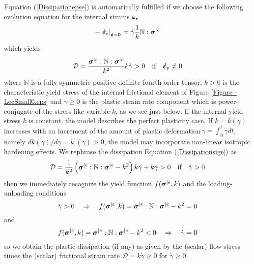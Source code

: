 \documentclass[preprint,review,12pt,sort&compress]{elsarticle}%
\newcommand{\epsdo}[0]{\scriptsize\mathbf{\dot \varepsilon} = \mathbf{0}\normalsize\mathbf{}}
\renewcommand{\mathbf}[1]{\mbox{\boldmath $#1$ \unboldmath}  \!\!}
\begin{document}
Equation (\ref{Dissipationepse}) is automatically fulfilled if we choose the
following evolution equation for the internal strains $\mathbf{\varepsilon
}_{e}$%
\begin{equation}
-\left.  \mathbf{\dot{\varepsilon}}_{e}\right\vert _{%
\epsdo
}=\dot{\gamma}\frac{1}{k}\mathbb{N}:\mathbf{\sigma}^{|e}
\label{flow rule small}%
\end{equation}
which yields%
\begin{equation}
\mathcal{D}=\frac{\mathbf{\sigma}^{|e}:\mathbb{N}:\mathbf{\sigma}^{|e}}{k^{2}%
}k\dot{\gamma}>0\text{\quad if}\quad\mathbf{\dot{\varepsilon}}_{p}\neq0
\label{Dissipationsige}%
\end{equation}
where $\mathbb{N}$ is a fully symmetric positive definite fourth-order tensor,
$k>0$ is the characteristic yield stress of the internal frictional element of
Figure \ref{Figure - LeeSmall0.eps} and $\dot{\gamma}\geq0$ is the plastic
strain rate component which is power-conjugate of the stress-like variable
$k$, as we see just below. If the internal yield stress $k$ is constant, the
model describes the perfect plasticity case. If $k=k\left(  \gamma\right)  $
increases with an increment of the amount of plastic deformation$\ \gamma
=\int_{0}^{t}\dot{\gamma}dt$, namely $dk\left(  \gamma\right)  /d\gamma
=k^{\prime}\left(  \gamma\right)  >0$, the model may incorporate non-linear
isotropic hardening effects. We rephrase the dissipation Equation
(\ref{Dissipationsige}) as%
\begin{equation}
\mathcal{D}=\frac{1}{k^{2}}\left(  \mathbf{\sigma}^{|e}:\mathbb{N}%
:\mathbf{\sigma}^{|e}-k^{2}\right)  k\dot{\gamma}+k\dot{\gamma}>0\text{\quad
if}\quad\dot{\gamma}>0 \label{Dissipation general small}%
\end{equation}
then we immediately recognize the yield function $f(\mathbf{\sigma}^{|e},k)$
and the loading-unloading conditions%
\begin{equation}
\dot{\gamma}>0\text{\quad}\Rightarrow\quad f(\mathbf{\sigma}^{|e}%
,k)=\mathbf{\sigma}^{|e}:\mathbb{N}:\mathbf{\sigma}^{|e}-k^{2}=0
\label{Yield fcn small}%
\end{equation}
and%
\begin{equation}
f(\mathbf{\sigma}^{|e},k)=\mathbf{\sigma}^{|e}:\mathbb{N}:\mathbf{\sigma}%
^{|e}-k^{2}<0\text{\quad}\Rightarrow\quad\dot{\gamma}=0
\label{elastic response small}%
\end{equation}
so we obtain the plastic dissipation (if any) as given by the (scalar) flow
stress times the (scalar) frictional strain rate $\mathcal{D}=k\dot{\gamma
}\geq0$ for $\dot{\gamma}\geq0$.
\end{document}
